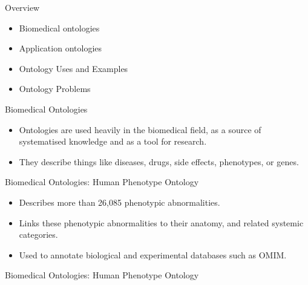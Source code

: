 \documentclass[aspectratio=169]{beamer} %
\begin{document}
\begin{frame}{Overview}
  \begin{itemize}
    \item Biomedical ontologies
    \item Application ontologies
    \item Ontology Uses and Examples
    \item Ontology Problems
  \end{itemize}
\end{frame}

\begin{frame}{Biomedical Ontologies}
  \begin{itemize}
    \item Ontologies are used heavily in the biomedical field, as a source of
    systematised knowledge and as a tool for research.
    \item They describe things like diseases, drugs, side effects, phenotypes, or
    genes.
  \end{itemize}
\end{frame}

\begin{frame}{Biomedical Ontologies: Human Phenotype Ontology}
\begin{itemize}
  \item Describes more than 26,085 phenotypic abnormalities.
  \item Links these phenotypic abnormalities to their anatomy, and related
  systemic categories.
  \item Used to annotate biological and experimental databases such as OMIM.
\end{itemize}
\end{frame}

\begin{frame}{Biomedical Ontologies: Human Phenotype Ontology}
\end{frame}
\end{document}
